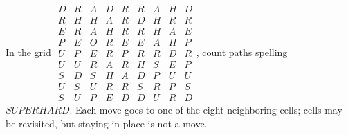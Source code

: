 In the grid $\begin{array}{ccccccccc}D&R&A&D&R&R&A&H&D\\R&H&H&A&R&D&H&R&R\\E&R&A&H&R&R&H&A&E\\P&E&O&R&E&E&A&H&P\\U&P&E&R&P&R&R&D&R\\U&U&R&A&R&H&S&E&P\\S&D&S&H&A&D&P&U&U\\U&S&U&R&R&S&R&P&S\\S&U&P&E&D&D&U&R&D\end{array}$, count paths spelling $SUPERHARD$. Each move goes to one of the eight neighboring cells; cells may be revisited, but staying in place is not a move.
